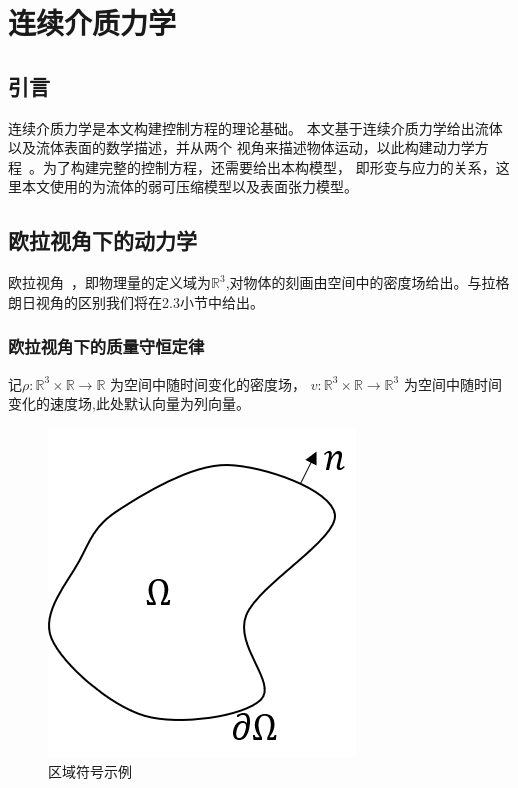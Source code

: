 \chapter{连续介质力学} \label{chap2}
\section{引言}
连续介质力学是本文构建控制方程的理论基础。
本文基于连续介质力学给出流体以及流体表面的数学描述，并从两个
视角来描述物体运动，以此构建动力学方程~\cite{gonzalez2008first}。为了构建完整的控制方程，还需要给出本构模型，
即形变与应力的关系，这里本文使用的为流体的弱可压缩模型以及表面张力模型。

\section{欧拉视角下的动力学}
欧拉视角~\cite{popinet2018numerical}，即物理量的定义域为$\mathbb{R}^3$,对物体的刻画由空间中的密度场给出。与拉格朗日视角的区别我们将在2.3小节中给出。

\subsection{欧拉视角下的质量守恒定律}
记$\rho : \mathbb{R}^3 \times \mathbb{R} \rightarrow \mathbb{R}$ 为空间中随时间变化的密度场，
$v : \mathbb{R}^3 \times \mathbb{R} \rightarrow \mathbb{R}^3$ 为空间中随时间变化的速度场,此处默认向量为列向量。
\begin{figure}[htbp]
    \centering
    \includegraphics[scale=0.5]{./images/image1.png}
    \caption[区域符号示例]{区域符号示例}
    \label{fig:domain}
\end{figure}

